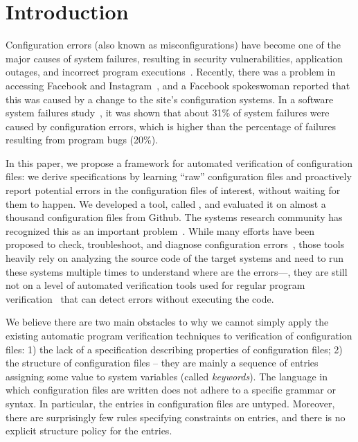 \section{Introduction}
\label{sec-intro}

Configuration errors (also known as misconfigurations) have become
one of the major causes of system failures, resulting in security vulnerabilities,
application outages, and incorrect program executions~\cite{xu15systems, xu13do, xu15hey}. Recently, there was a problem in accessing  
Facebook and Instagram~\cite{mashableNews}, 
and a Facebook spokeswoman reported that 
this was caused by a change to the site's configuration systems.
In a software system failures study~\cite{yin11anempirical},
it was shown that about 31\% of system failures were caused by 
configuration errors, which is higher than the percentage of
failures resulting from program bugs (20\%).

In this paper, we propose
a framework for automated verification of configuration files: 
we derive specifications by learning ``raw'' configuration files 
and proactively report potential errors in the configuration files
of interest, without waiting for them to happen. 
We developed a tool, called \app, 
and evaluated it on 
almost a thousand configuration files from Github. The systems research community has recognized this as an important
problem~\cite{xu16early}. While many efforts have been proposed to
check, troubleshoot, and diagnose configuration 
errors~\cite{attariyan10automating,
su07autobash, whitaker04configuration},
those tools heavily rely on analyzing the source code of 
the target systems and need to run these systems
multiple times to understand where are the errors---\ie,
they are still not on a level of
automated verification tools used for regular program 
verification~\cite{Leino10Dafny, PiskacWZ14, BobotFMP15} that can
detect errors without executing the code. 

We believe there are two main obstacles 
to why we cannot simply apply the existing automatic program
verification 
techniques to verification of configuration files:
1) the lack
of a specification describing properties of configuration files;
2) the structure of configuration files -- they
are mainly a sequence of entries assigning some value to system
variables (called {\emph {keywords}}). 
The language in which configuration files are written does 
not adhere to a specific grammar or syntax. In particular, the
entries in configuration files are untyped. Moreover, there are surprisingly few rules specifying constraints on entries, and there
is no explicit structure policy for the entries.

